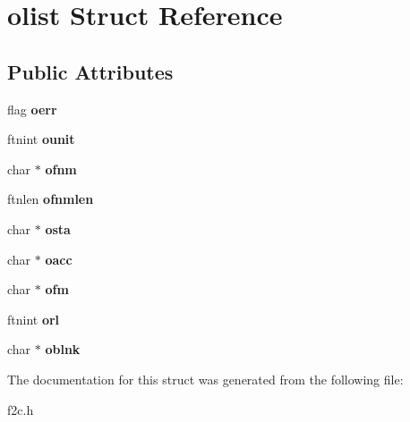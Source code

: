 \hypertarget{structolist}{
\section{olist Struct Reference}
\label{structolist}
}
\subsection*{Public Attributes}
\begin{DoxyCompactItemize}
\item 
\hypertarget{structolist_acb7f3c45380f7965c9ab177c228ed936}{
flag {\bfseries oerr}}
\label{structolist_acb7f3c45380f7965c9ab177c228ed936}

\item 
\hypertarget{structolist_af4443a6a577bfe9292cbf741c24c6e79}{
ftnint {\bfseries ounit}}
\label{structolist_af4443a6a577bfe9292cbf741c24c6e79}

\item 
\hypertarget{structolist_a6af6060865be898dfc66c0fd6630d545}{
char $\ast$ {\bfseries ofnm}}
\label{structolist_a6af6060865be898dfc66c0fd6630d545}

\item 
\hypertarget{structolist_a497ca7ef9c2e42d5cd30c847fdbd3f10}{
ftnlen {\bfseries ofnmlen}}
\label{structolist_a497ca7ef9c2e42d5cd30c847fdbd3f10}

\item 
\hypertarget{structolist_a2cf08ac4e1e2fc9e6f21299df3f1d2e6}{
char $\ast$ {\bfseries osta}}
\label{structolist_a2cf08ac4e1e2fc9e6f21299df3f1d2e6}

\item 
\hypertarget{structolist_ad27927ac817bff0dbfa00d07f3e3e2d2}{
char $\ast$ {\bfseries oacc}}
\label{structolist_ad27927ac817bff0dbfa00d07f3e3e2d2}

\item 
\hypertarget{structolist_abe3c8fd2be6dc58be3157e2e0f48cf6a}{
char $\ast$ {\bfseries ofm}}
\label{structolist_abe3c8fd2be6dc58be3157e2e0f48cf6a}

\item 
\hypertarget{structolist_a4c83b168f7afdd6c81a7843193c5755e}{
ftnint {\bfseries orl}}
\label{structolist_a4c83b168f7afdd6c81a7843193c5755e}

\item 
\hypertarget{structolist_a6b914b4f6d4df1f377d40c964bd71625}{
char $\ast$ {\bfseries oblnk}}
\label{structolist_a6b914b4f6d4df1f377d40c964bd71625}

\end{DoxyCompactItemize}


The documentation for this struct was generated from the following file:\begin{DoxyCompactItemize}
\item 
f2c.h\end{DoxyCompactItemize}
